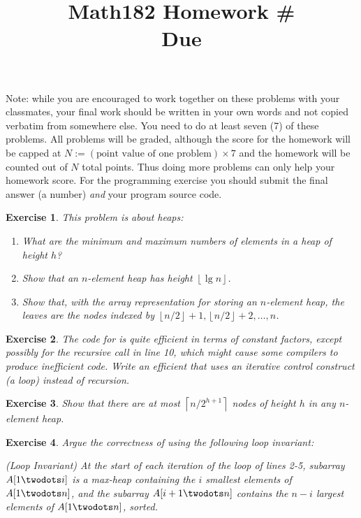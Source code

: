 \documentclass[11pt]{amsart}
\title{Math182 Homework \#\homeworknumber
\\ Due \duedate}
\theoremstyle{theorem}
\newtheorem{exercise}{Exercise}
\newcommand{\floor}[1]{\left\lfloor #1 \right\rfloor}
\newcommand{\ceil}[1]{\left\lceil #1 \right\rceil}
\begin{document}
\maketitle


Note: while you are encouraged to work together on these problems with your classmates, your final work should be written in your own words and not copied verbatim from somewhere else. You need to do at least seven (7) of these problems. All problems will be graded, although the score for the homework will be capped at $N:=(\text{point value of one problem})\times 7$ and the homework will be counted out of $N$ total points. Thus doing more problems can only help your homework score. For the programming exercise you should submit the final answer (a number) \emph{and} your program source code.


\begin{exercise}
This problem is about heaps:
\begin{enumerate}
\item What are the minimum and maximum numbers of elements in a heap of height $h$?
\item Show that an $n$-element heap has height $\floor{\lg n}$.
\item Show that, with the array representation for storing an $n$-element heap, the leaves are the nodes indexed by $\floor{n/2}+1,\floor{n/2}+2,\ldots,n$.
\end{enumerate}
\end{exercise}

\begin{exercise}
The code for  is quite efficient in terms of constant factors, except possibly for the recursive call in line 10, which might cause some compilers to produce inefficient code. Write an efficient  that uses an iterative control construct (a loop) instead of recursion.
\end{exercise}

\begin{exercise}
Show that there are at most $\ceil{n/2^{h+1}}$ nodes of height $h$ in any $n$-element heap.
\end{exercise}

\begin{exercise}
Argue the correctness of  using the following loop invariant:
\begin{displayquote}
(Loop Invariant) At the start of each iteration of the \For loop of lines 2-5, subarray $A[1\twodots i]$ is a max-heap containing the $i$ smallest elements of $A[1\twodots n]$, and the subarray $A[i+1\twodots n]$ contains the $n-i$ largest elements of $A[1\twodots n]$, sorted.
\end{displayquote}
\end{exercise}
\end{document}

